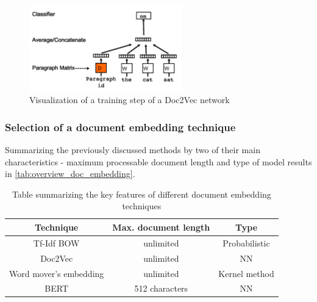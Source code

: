 \begin{figure}[htbp!]
	\centering
	\includegraphics[width=250px]{../chapters/implementation/pics/doc2vec}
	\caption{\label{pic:doc2vec} Visualization of a training step of a Doc2Vec network {\cite{wuWordMoverEmbedding2018}}}
\end{figure}

\subsubsection{Selection of a document embedding technique}

Summarizing the previously discussed methods by two of their main characteristics -  maximum processable document length and type of model results in  \autoref{tab:overview_doc_embedding}.
\begin{table}
	\centering
	\begin{tabular}{ c | c | c }
		\hline 
		Technique & Max. document length & Type \\ \hline
		Tf-Idf BOW & unlimited & Probabilistic \\ \hline
		Doc2Vec & unlimited & NN \\ \hline
		Word mover's embedding & unlimited & Kernel method \\ \hline
		BERT & 512 characters & NN \\ \hline
	\end{tabular}
	\caption{\label{tab:overview_doc_embedding} Table summarizing the key features of different document embedding techniques}
\end{table}

